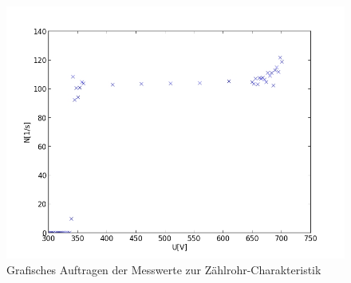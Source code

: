 	\begin{figure}[h]
		\begin{center}
		\includegraphics[scale=0.75]{picA.jpg}
		\caption{Grafisches Auftragen der Messwerte zur Zählrohr-Charakteristik}
		\label{picA}
		\end{center}	
	\end{figure}
